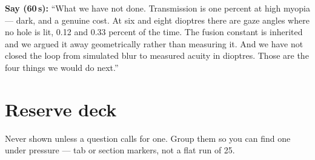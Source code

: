 \documentclass[11pt]{report}
\begin{document}
\textbf{Say (60\,s):} ``What we have not done. Transmission is one percent at high myopia --- dark, and
a genuine cost. At six and eight dioptres there are gaze angles where no hole is lit, 0.12 and 0.33
percent of the time. The fusion constant is inherited and we argued it away geometrically rather than
measuring it. And we have not closed the loop from simulated blur to measured acuity in dioptres.
Those are the four things we would do next.''

\chapter{Reserve deck}

Never shown unless a question calls for one. Group them so you can find one under pressure ---
tab or section markers, not a flat run of 25.
\end{document}
